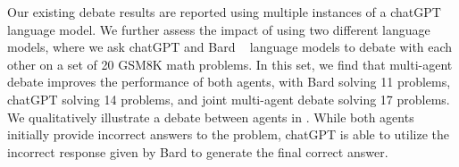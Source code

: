  Our existing debate results are reported using multiple instances of a chatGPT language model. We further assess the impact of using two different language models, where we ask chatGPT and Bard ~\cite{Pichai_2023} language models to debate with each other on a set of 20 GSM8K math problems.  In this set, we find that multi-agent debate improves the performance of both agents, with Bard solving 11 problems, chatGPT solving 14 problems, and joint multi-agent debate solving 17 problems. We qualitatively illustrate a debate between agents in . While both agents initially provide incorrect answers to the problem, chatGPT is able to utilize the incorrect response given by Bard to generate the final correct answer.

